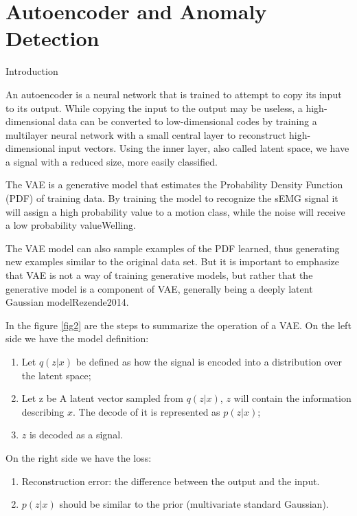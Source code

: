 \documentclass[a4paper, 12pt]{ppgeb}
\makeatletter
\renewcommand{\section}{\@startsection
{section}
{1}
{0mm}
{-\baselineskip}
{0.5\baselineskip}
{\large\bfseries\scshape}}
\makeatother
\begin{document}
\chapter{Autoencoder and Anomaly Detection}\label{ch:AnamalyAnalisys}

\section{Introduction}

An autoencoder is a neural network that is trained to attempt to copy its input to its output. While copying the input to the output may be useless, a high-dimensional data can be converted to low-dimensional codes by training a multilayer neural network with a small central layer to reconstruct high-dimensional input vectors. Using the inner layer, also called latent space, we have a signal with a reduced size, more easily classified.

The \ac{VAE} is a generative model that estimates the Probability Density Function (\ac{PDF}) of training 
data. By training the model to recognize the \ac{sEMG} signal it will assign a high probability value to a motion class, while the noise will receive a low probability value\cite{mainreferences}{Welling}.

The \ac{VAE} model can also sample examples of the PDF learned, thus generating new examples similar to the original data set. But it is important to emphasize that \ac{VAE} is not a way of training generative models, but rather that the generative model is a component of \ac{VAE}, generally being a deeply latent Gaussian model\cite{mainreferences}{Rezende2014}.

In the figure \ref{fig2} are the steps to summarize the operation of a \ac{VAE}. On the left side we have the model definition:

\begin{enumerate}
    \item  Let \(q(z|x)\) be defined as how the signal is encoded into a distribution over the latent space;
    \item  Let z be A latent vector sampled from \( q(z|x) \), \(z\) will contain the information describing \(x\). The decode of it is represented as \( p(z|x) \);
    \item  \(z\) is decoded as a signal.
\end{enumerate}

On the right side we have the loss:

\begin{enumerate}
    \item Reconstruction error: the difference between the output and the input.
    \item \( p(z|x)\) should be similar to the prior (multivariate standard Gaussian).
\end{enumerate}
\end{document}
